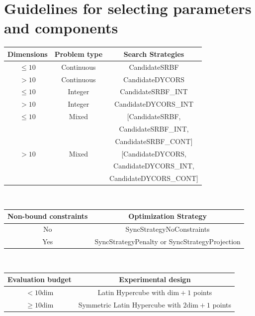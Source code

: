 \documentclass[]{article}
\begin{document}
\section{Guidelines for selecting parameters and components}
\begin{center}
\begin{tabular}{ c c | c }
  	\hline			
	Dimensions & Problem type & Search Strategies \\
	\hline  
   	$\leq 10$ & Continuous & CandidateSRBF \\
   	$> 10$ & Continuous & CandidateDYCORS\\
   	\hline
   	$\leq 10$ & Integer & CandidateSRBF\_INT \\
   	$> 10$ & Integer & CandidateDYCORS\_INT \\
   	\hline
   	$\leq 10$ & Mixed &  \multirow{1}{*}{[CandidateSRBF,} \\ & & 
   	CandidateSRBF\_INT,  \\ & & CandidateSRBF\_CONT] \\
   	$> 10$ & Mixed &  \multirow{1}{*}{[CandidateDYCORS,} \\ & & 
   	CandidateDYCORS\_INT, \\ & & CandidateDYCORS\_CONT] \\
   	\hline
\end{tabular}
\end{center}

\ \newline

\begin{center}
\begin{tabular}{ c | c }
  \hline			
Non-bound constraints & Optimization Strategy \\
  \hline  
  No & SyncStrategyNoConstraints \\
  Yes & SyncStrategyPenalty or SyncStrategyProjection \\
  \hline
\end{tabular}
\end{center}

\ \newline

\begin{center}
\begin{tabular}{ c | c }
  	\hline			
	Evaluation budget & Experimental design \\
  	\hline  
  	$< 10 \text{dim}$ & Latin Hypercube with $\text{dim}+1$ points \\
  	$\geq 10 \text{dim}$ & Symmetric Latin Hypercube with $2\text{dim}+1$ points \\
  	\hline
\end{tabular}
\end{center}
\end{document}
